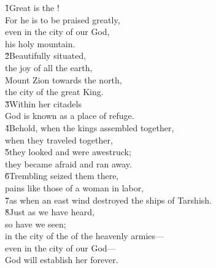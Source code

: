 \begin{poetry}
\poeml \v{1}Great is the ! \\
\poemll    For he is to be praised greatly, \\
\poeml even in the city of our God, \\
\poemll    his holy mountain. \\
\poeml \v{2}Beautifully situated, \\
\poemll    the joy of all the earth, \\
\poeml Mount Zion towards the north, \\
\poemll    the city of the great King. \\
\poeml \v{3}Within her citadels \\
\poemll    God is known as a place of refuge. \\
\poeml \v{4}Behold, when the kings assembled together, \\
\poemll    when they traveled together, \\
\poeml \v{5}they looked and were awestruck; \\
\poemll    they became afraid and ran away. \\
\poeml \v{6}Trembling seized them there, \\
\poemll    pains like those of a woman in labor, \\
\poeml \v{7}as when an east wind destroyed the ships of Tarshish. \\
\poeml \v{8}Just as we have heard, \\
\poemll    so have we seen; \\
\poeml in the city of the  of the heavenly armies--- \\
\poemll    even in the city of our God--- \\
\poemlll       God will establish her forever.
\end{poetry}

